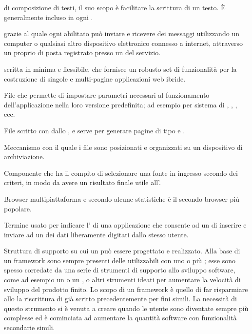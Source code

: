 

{ di composizione di testi, il suo scopo è facilitare la scrittura di un testo. \`{E} generalmente incluso in ogni .}

{  grazie al quale ogni  abilitato può inviare e ricevere dei messaggi utilizzando un computer o qualsiasi altro dispositivo elettronico connesso a internet, attraverso un proprio  di posta registrato presso un  del servizio.}

{ scritta in  minima e flessibile, che fornisce un robusto set di funzionalità per la costruzione di singole e multi-pagine applicazioni web ibride.}




{File che permette di impostare parametri necessari al funzionamento dell'applicazione nella loro versione predefinita; ad esempio  per sistema di , , , ecc.}

{File scritto con   dallo , e serve per generare pagine di tipo  e .}

{Meccanismo con il quale i file sono posizionati e organizzati su un dispositivo di archiviazione.}

{Componente che ha il compito di selezionare una fonte in ingresso secondo dei criteri, in modo da avere un risultato finale utile all'.}

{Browser  multipiattaforma e secondo alcune statistiche è il secondo browser più popolare.}


{Termine usato per indicare l' di una applicazione che consente ad un  di inserire e inviare ad un  dei dati liberamente digitati dallo stesso utente.}


{Struttura di supporto su cui un  può essere progettato e realizzato. Alla base di un framework sono sempre presenti delle  utilizzabili con uno o più ; esse sono spesso corredate da una serie di strumenti di supporto allo sviluppo software, come ad esempio un  o un , o altri strumenti ideati per aumentare la velocità di sviluppo del prodotto finito.
Lo scopo di un framework è quello di far risparmiare allo  la riscrittura di  già scritto precedentemente per fini simili. La necessità di questo strumento si è venuta a creare quando le  utente sono diventate sempre più complesse ed è cominciata ad aumentare la quantità software con funzionalità secondarie simili.}


